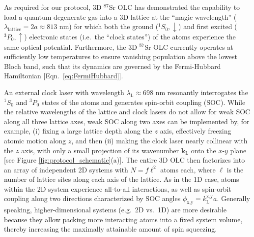 \documentclass[aps,prx,superscriptaddress,notitlepage,twocolumn,longbibliography]{revtex4-2}
\renewcommand{\t}{\text} %
\renewcommand{\v}{\bm} %
\newcommand{\x}{\text{x}}
\newcommand{\y}{\text{y}}
\newcommand{\up}{\uparrow}
\newcommand{\dn}{\downarrow}
\begin{document}
As required for our protocol, 3D $^{87}$Sr OLC has demonstrated the capability to load a quantum degenerate gas into a 3D lattice at the ``magic wavelength'' ($\lambda_{\t{lattice}}=2a\approx813$ nm) for which both the ground ($^1S_0,\dn$) and first excited ($^3P_0,\up$) electronic states (i.e.~the ``clock states'') of the atoms experience the same optical potential\cite{campbell2017fermidegenerate}.
Furthermore, the 3D $^{87}$Sr OLC currently operates at sufficiently low temperatures to ensure vanishing population above the lowest Bloch band, such that its dynamics are governed by the Fermi-Hubbard Hamiltonian [Eqn.~\eqref{eq:FermiHubbard}]\cite{esslinger2010fermihubbard}.

An external clock laser with wavelength $\lambda_{\t{L}}\approx698$ nm resonantly interrogates the $^1S_0$ and $^3P_0$ states of the atoms and generates spin-orbit coupling (SOC)\cite{wall2016synthetic}.
While the relative wavelengths of the lattice and clock lasers do not allow for weak SOC along all three lattice axes, weak SOC along two axes can be implemented by, for example, (i) fixing a large lattice depth along the $z$ axis, effectively freezing atomic motion along  $z$, and then (ii) making the clock laser nearly collinear with the $z$ axis, with only a small projection of its wavenumber $\v k_{\t{L}}$ onto the $x$-$y$ plane [see Figure \ref{fig:protocol_schematic}(a)].
The entire 3D OLC then factorizes into an array of independent 2D systems with $N=f\ell^2$ atoms each, where $\ell$ is the number of lattice sites along each axis of the lattice.
As in the 1D case, atoms within the 2D system experience all-to-all interactions, as well as spin-orbit coupling along two directions characterized by SOC angles $\phi_{\x,\y}=k_{\t{L}}^{\x,\y}a$.
Generally speaking, higher-dimensional systems (e.g.~2D vs.~1D) are more desirable because they allow packing more interacting atoms into a fixed system volume, thereby increasing the maximally attainable amount of spin squeezing.
\end{document}
